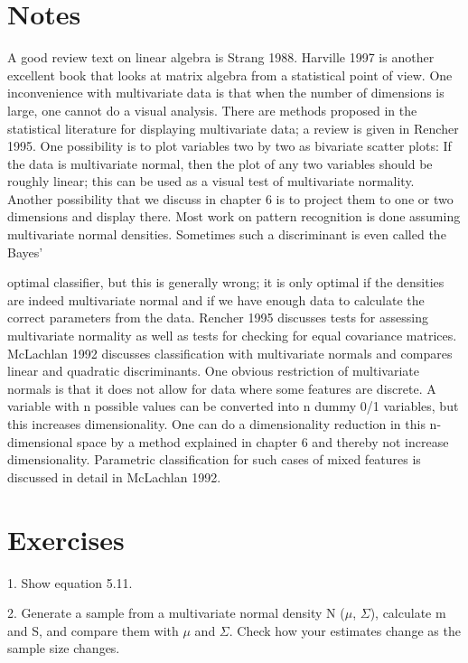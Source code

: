 \section{Notes}

A good review text on linear algebra is Strang 1988. Harville 1997 is another excellent book that looks at matrix algebra from a statistical point of view. One inconvenience with multivariate data is that when the number of dimensions is large, one cannot do a visual analysis. There are methods proposed in the statistical literature for displaying multivariate data; a review is given in Rencher 1995. One possibility is to plot variables two by two as bivariate scatter plots: If the data is multivariate normal, then the plot of any two variables should be roughly linear; this can be used as a visual test of multivariate normality. Another possibility that we discuss in chapter 6 is to project them to one or two dimensions and display there. Most work on pattern recognition is done assuming multivariate normal densities. Sometimes such a discriminant is even called the Bayes’

optimal classifier, but this is generally wrong; it is only optimal if the densities are indeed multivariate normal and if we have enough data to calculate the correct parameters from the data. Rencher 1995 discusses tests for assessing multivariate normality as well as tests for checking for equal covariance matrices. McLachlan 1992 discusses classification with multivariate normals and compares linear and quadratic discriminants. One obvious restriction of multivariate normals is that it does not allow for data where some features are discrete. A variable with n possible values can be converted into n dummy 0/1 variables, but this increases dimensionality. One can do a dimensionality reduction in this n-dimensional space by a method explained in chapter 6 and thereby not increase dimensionality. Parametric classification for such cases of mixed features is discussed in detail in McLachlan 1992.

\section{Exercises}

1. Show equation 5.11.

2. Generate a sample from a multivariate normal density N ($\mu$, $\Sigma$), calculate m and S, and compare them with $\mu$ and $\Sigma$. Check how your estimates change as the sample size changes.

